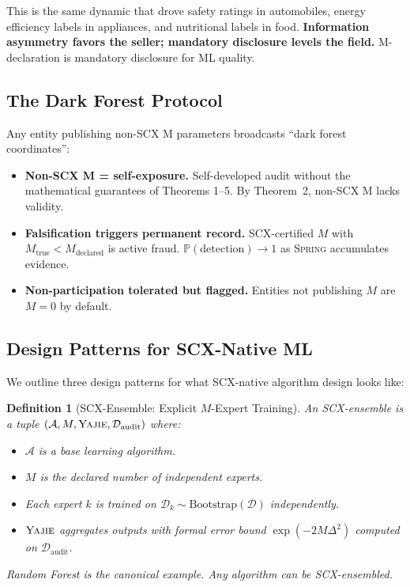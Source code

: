 \documentclass[12pt,a4paper]{article}
\newtheorem{definition}[theorem]{Definition}
\theoremstyle{definition}
\newcommand{\Yajie}{\textsc{Yajie}}
\newcommand{\Spring}{\textsc{Spring}}
\newcommand{\SCX}{\textsc{SCX}}
\newcommand{\Pbb}{\mathbb{P}}
\newcommand{\cA}{\mathcal{A}}
\newcommand{\cD}{\mathcal{D}}
\begin{document}
This is the same dynamic that drove safety ratings in automobiles, energy efficiency labels in appliances, and nutritional labels in food. \textbf{Information asymmetry favors the seller; mandatory disclosure levels the field.} M-declaration is mandatory disclosure for ML quality.

\subsection{The Dark Forest Protocol }

Any entity publishing non-\SCX{} M parameters broadcasts ``dark forest coordinates'':
\begin{itemize}[nosep]
    \item \textbf{Non-SCX M = self-exposure.} Self-developed audit without the mathematical guarantees of Theorems 1--5. By Theorem~2, non-\SCX{} M lacks validity.
    \item \textbf{Falsification triggers permanent record.} \SCX{}-certified $M$ with $M_{\text{true}} < M_{\text{declared}}$ is active fraud. $\Pbb(\text{detection}) \to 1$ as \Spring{} accumulates evidence.
    \item \textbf{Non-participation tolerated but flagged.} Entities not publishing $M$ are $M=0$ by default.
\end{itemize}

\subsection{Design Patterns for SCX-Native ML}

We outline three design patterns for what \SCX{}-native algorithm design looks like:

\begin{definition}[SCX-Ensemble: Explicit $M$-Expert Training]\label{def:scx_ensemble}
An \SCX{}-ensemble is a tuple $(\cA, M, \Yajie, \cD_{\text{audit}})$ where:
\begin{itemize}[nosep]
    \item $\cA$ is a base learning algorithm.
    \item $M$ is the declared number of independent experts.
    \item Each expert $k$ is trained on $\cD_k \sim \text{Bootstrap}(\cD)$ independently.
    \item $\Yajie$ aggregates outputs with formal error bound $\exp(-2M\Delta^2)$ computed on $\cD_{\text{audit}}$.
\end{itemize}
Random Forest is the canonical example. Any algorithm can be \SCX{}-ensembled.
\end{definition}
\end{document}
